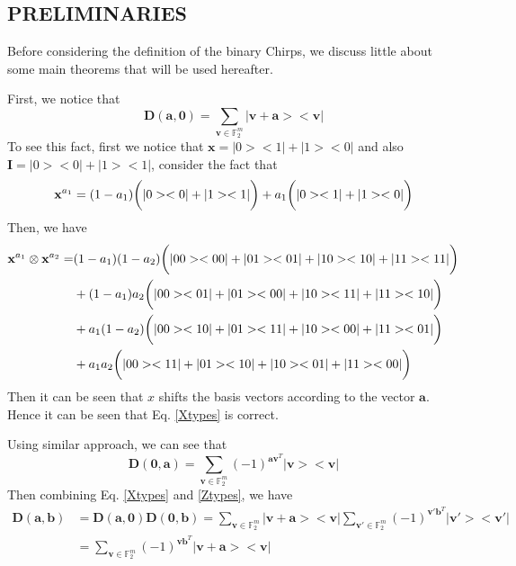 \documentclass{article}
\begin{document}
\subsection{PRELIMINARIES}
Before considering the definition of the binary Chirps, we discuss little about some main theorems that will be used hereafter.


First, we notice that 
\begin{equation}\label{Xtypes}
	\mathbf{D}\left(\mathbf{a}, \mathbf{0}\right) = \sum_{\mathbf{v} \in \mathbb{F}_2^m}{|\mathbf{v+a}><\mathbf{v}|}
\end{equation} 
To see this fact, first we notice that $\mathbf{x} = |0><1| + |1><0|$ and also $\mathbf{I} = |0><0| + |1><1|$, consider the fact that 
\begin{equation*}
	\mathbf{x}^{a_1}  = (1-a_1)\bigg{(}|0><0| + |1><1|\bigg{)}+a_1 \bigg{(} |0><1| + |1><0| \bigg{)}
\end{equation*}
Then, we have
\begin{align*}
	\mathbf{x}^{a_1} \otimes \mathbf{x}^{a_2} =& (1-a_1)(1-a_2)\bigg{(} |00><00|+|01><01|+|10><10|+|11><11| \bigg{)}\\
	&+ (1-a_1)a_2\bigg{(} |00><01|+|01><00|+|10><11|+|11><10| \bigg{)} \\
	&+a_1(1-a_2)\bigg{(} |00><10|+|01><11|+|10><00|+|11><01| \bigg{)} \\
	&+a_1 a_2 \bigg{(} |00><11|+|01><10|+|10><01|+|11><00| \bigg{)}
\end{align*}
Then it can be seen that $x$ shifts the basis vectors according to the vector $\mathbf{a}$. Hence it can be seen that Eq. \eqref{Xtypes} is correct.


Using similar approach, we can see that 
\begin{equation}\label{Ztypes}
	\mathbf{D}\left(\mathbf{0},\mathbf{a}\right) = \sum_{\mathbf{v}\in \mathbb{F}_2^m}{ (-1)^{\mathbf{a} \mathbf{v}^T} |\mathbf{v}><\mathbf{v}|}
\end{equation}
Then combining Eq. \eqref{Xtypes} and \eqref{Ztypes}, we have 
\begin{align}\label{XZtypes}
	\mathbf{D}\left(\mathbf{a}, \mathbf{b}\right) &=\mathbf{D}\left(\mathbf{a}, \mathbf{0}\right) \mathbf{D}\left(\mathbf{0}, \mathbf{b}\right) = \sum_{\mathbf{v} \in \mathbb{F}_2^m}{|\mathbf{v+a}><\mathbf{v}|}  \sum_{\mathbf{v}'\in \mathbb{F}_2^m}{ (-1)^{\mathbf{v}' \mathbf{b}^T} |\mathbf{v}'><\mathbf{v}'|} \nonumber \\
	& = \sum_{\mathbf{v} \in \mathbb{F}_2^m}{(-1)^{\mathbf{v} \mathbf{b}^T} |\mathbf{v+a}><\mathbf{v}|}
\end{align}
\end{document}
